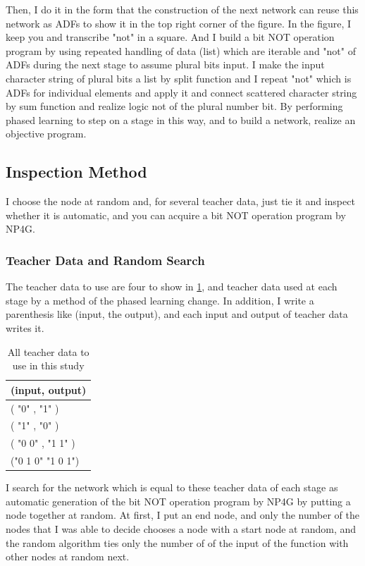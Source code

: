 \documentclass{article}
\begin{document}
Then, I do it in the form that the construction of the next network can reuse this network as ADFs to show it in the top right corner of the figure.
In the figure, I keep you and transcribe "not" in a square.
And I build a bit NOT operation program by using repeated handling of data (list) which are iterable and "not" of ADFs during the next stage to assume plural bits input.
I make the input character string of plural bits a list by split function and I repeat "not" which is ADFs for individual elements and apply it and connect scattered character string by sum function and realize logic not of the plural number bit.
By performing phased learning to step on a stage in this way, and to build a network, realize an objective program.

\subsection {Inspection Method}
I choose the node at random and, for several teacher data, just tie it and inspect whether it is automatic, and you can acquire a bit NOT operation program by NP4G.

\subsubsection {Teacher Data and Random Search}
The teacher data to use are four to show in \ref{tbl:TeacherData}, and teacher data used at each stage by a method of the phased learning change.
In addition, I write a parenthesis like (input, the output), and each input and output of teacher data writes it.

\begin{table}[htbp]
\centering
\caption {All teacher data to use in this study}
\label{tbl:TeacherData}
\begin{tabular}{l}
\hline
(input, output) \\
\hline \hline
( "0" , "1" ) \\
( "1" , "0" ) \\
( "0 0" , "1 1" ) \\
("0 1 0" "1 0 1") \\
\hline
\end{tabular}
\end{table}

I search for the network which is equal to these teacher data of each stage as automatic generation of the bit NOT operation program by NP4G by putting a node together at random.
At first, I put an end node, and only the number of the nodes that I was able to decide chooses a node with a start node at random, and the random algorithm ties only the number of of the input of the function with other nodes at random next.
\end{document}
